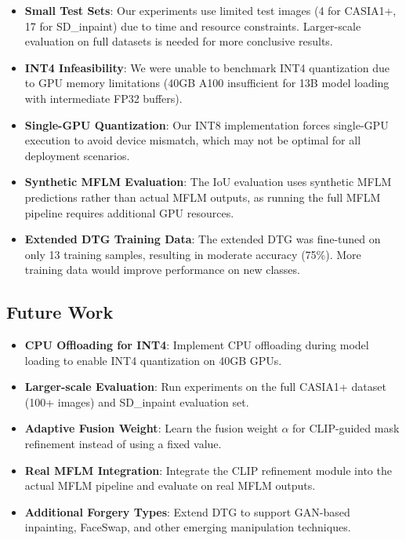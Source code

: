 \begin{itemize}
    \item \textbf{Small Test Sets}: Our experiments use limited test images (4 for CASIA1+, 17 for SD\_inpaint) due to time and resource constraints. Larger-scale evaluation on full datasets is needed for more conclusive results.
    \item \textbf{INT4 Infeasibility}: We were unable to benchmark INT4 quantization due to GPU memory limitations (40GB A100 insufficient for 13B model loading with intermediate FP32 buffers).
    \item \textbf{Single-GPU Quantization}: Our INT8 implementation forces single-GPU execution to avoid device mismatch, which may not be optimal for all deployment scenarios.
    \item \textbf{Synthetic MFLM Evaluation}: The IoU evaluation uses synthetic MFLM predictions rather than actual MFLM outputs, as running the full MFLM pipeline requires additional GPU resources.
    \item \textbf{Extended DTG Training Data}: The extended DTG was fine-tuned on only 13 training samples, resulting in moderate accuracy (75\%). More training data would improve performance on new classes.
\end{itemize}

\subsection{Future Work}

\begin{itemize}
    \item \textbf{CPU Offloading for INT4}: Implement CPU offloading during model loading to enable INT4 quantization on 40GB GPUs.
    \item \textbf{Larger-scale Evaluation}: Run experiments on the full CASIA1+ dataset (100+ images) and SD\_inpaint evaluation set.
    \item \textbf{Adaptive Fusion Weight}: Learn the fusion weight $\alpha$ for CLIP-guided mask refinement instead of using a fixed value.
    \item \textbf{Real MFLM Integration}: Integrate the CLIP refinement module into the actual MFLM pipeline and evaluate on real MFLM outputs.
    \item \textbf{Additional Forgery Types}: Extend DTG to support GAN-based inpainting, FaceSwap, and other emerging manipulation techniques.
\end{itemize}


